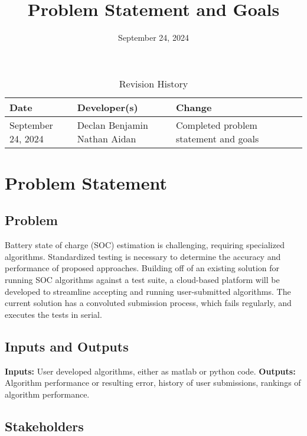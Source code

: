 \documentclass{article}
\title{Problem Statement and Goals\\\progname}
\author{\authname}
\date{September 24, 2024}
\begin{document}
\maketitle

\begin{table}[hp]
\caption{Revision History} \label{TblRevisionHistory}
\begin{tabularx}{\textwidth}{lp{2cm}lp{3cm}lp{6cm}}
\toprule
\textbf{Date} & \textbf{Developer(s)} & \textbf{Change}\\
\midrule
September 24, 2024 & Declan Benjamin Nathan Aidan & Completed problem statement and goals\\
\bottomrule
\end{tabularx}
\end{table}

\section{Problem Statement}

\subsection{Problem}

Battery state of charge (SOC) estimation is challenging, requiring specialized algorithms. Standardized testing is necessary to determine the accuracy and performance of proposed approaches. Building off of an existing solution for running SOC algorithms against a test suite, a cloud-based platform will be developed to streamline accepting and running user-submitted algorithms. The current solution has a convoluted submission process, which fails regularly, and executes the tests in serial. 

\subsection{Inputs and Outputs}

\textbf{Inputs:} \newline
User developed algorithms, either as matlab or python code. \newline \newline
\textbf{Outputs:} \newline
Algorithm performance or resulting error, history of user submissions, rankings of algorithm performance.

\subsection{Stakeholders}
\end{document}

